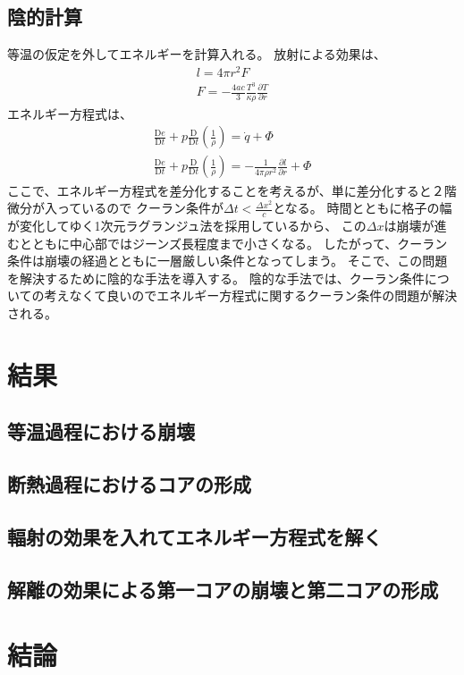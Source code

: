 \documentclass{jsarticle}
\newcommand{\pder}[2][]{\frac{\partial#1}{\partial#2}}
\newcommand{\Dder}[2][]{\frac{\mathrm{D}#1}{\mathrm{D}#2}}
\begin{document}
\subsection{陰的計算}
等温の仮定を外してエネルギーを計算入れる。
放射による効果は、
\begin{align}
    l = 4\pi r^2 F\\
    F = - \frac{4ac}{3} \frac{T^3}{\kappa \rho}\pder[T]{r}
\end{align}
エネルギー方程式は、
\begin{align}
\Dder[e]{t} + p \Dder[]{t}(\frac{1}{\rho}) = \dot{q} + \Phi\\
\Dder[e]{t} + p \Dder[]{t}(\frac{1}{\rho}) = - \frac{1}{4\pi\rho r^2}\pder[l]{r} + \Phi
\end{align}    
ここで、エネルギー方程式を差分化することを考えるが、単に差分化すると２階微分が入っているので
クーラン条件が$\Delta t < \frac{\Delta x^2}{c}$となる。
時間とともに格子の幅が変化してゆく1次元ラグランジュ法を採用しているから、
この$\Delta x$は崩壊が進むとともに中心部ではジーンズ長程度まで小さくなる。
したがって、クーラン条件は崩壊の経過とともに一層厳しい条件となってしまう。
そこで、この問題を解決するために陰的な手法を導入する。
陰的な手法では、クーラン条件についての考えなくて良いのでエネルギー方程式に関するクーラン条件の問題が解決される。

\section{結果}
\subsection{等温過程における崩壊}
\subsection{断熱過程におけるコアの形成}
\subsection{輻射の効果を入れてエネルギー方程式を解く}
\subsection{解離の効果による第一コアの崩壊と第二コアの形成}

\section{結論}


\end{document}
